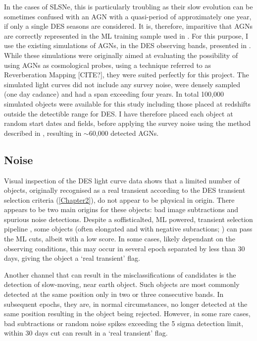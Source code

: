 In the cases of SLSNe, this is particularly troubling as their slow evolution can be sometimes confused with an AGN with a quasi-period of approximately one year, if only a single DES seasons are considered. It is, therefore, imparitive that AGNs are correctly represented in the ML training sample used in . For this purpose, I use the existing simulations of AGNs, in the DES observing bands, presented in \citet{Honig2016}. While these simulations were originally aimed at evaluating the possibility of using AGNs as cosmological probes, using a technique referred to as Reverberation Mapping [CITE?], they were suited perfectly for this project. The simulated light curves did not include any survey noise, were densely sampled (one day cadance) and had a span exceeding four years. In total 100,000 simulated objects were available for this study including those placed at redshifts outside the detectible range for DES. I have therefore placed each object at random start dates and fields, before applying the survey noise using the method described in , resulting in $\sim$60,000 detected AGNs.

\subsection{Noise}
Visual inspection of the DES light curve data shows that a limited number of objects, originally recognised as a real transient according to the DES transient selection criteria (\cref{Chapter2}), do not appear to be physical in origin. There appears to be two main origins for these objects: bad image subtractions and spurious noise detections. Despite a soffisticalted, ML powered, transient selection pipeline \citep{Goldstein2015}, some objects (often elongated and with negative subractions; ) can pass the ML cuts, albeit with a low score. In some cases, likely dependant on the observing conditions, this may occur in several epoch separated by less than 30 days, giving the object a `real transient' flag.

Another channel that can result in the misclassifications of candidates is the detection of slow-moving, near earth object. Such objects are most commonly detected at the same position only in two or three consecutive bands. In subsequent epochs, they are, in normal circumstances, no longer detected at the same position resulting in the object being rejected. However, in some rare cases, bad subtractions or random noise spikes exceeding the 5 sigma detection limit, within 30 days cut can result in a `real transient' flag.

